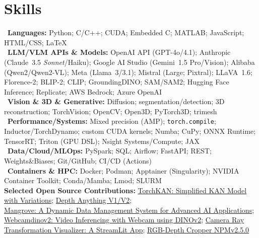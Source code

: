 \section*{Skills}

\textbullet~\textbf{Languages:} Python; C/C++; CUDA; Embedded C; MATLAB; JavaScript; HTML/CSS; \LaTeX\\
\textbullet~\textbf{LLM/VLM APIs \& Models:} OpenAI API (GPT\mbox{-}4o/4.1); Anthropic (Claude~3.5 \emph{Sonnet}/Haiku); Google AI Studio (Gemini~1.5 Pro/Vision); Alibaba (Qwen2/Qwen2\mbox{-}VL); Meta (Llama~3/3.1); Mistral (Large; Pixtral); LLaVA~1.6; Florence\mbox{-}2; BLIP\mbox{-}2; CLIP; GroundingDINO; SAM/SAM2; Hugging Face Inference; Replicate; AWS Bedrock; Azure OpenAI\\
\textbullet~\textbf{Vision \& 3D \& Generative:} Diffusion; segmentation/detection; 3D reconstruction; TorchVision; OpenCV; Open3D; PyTorch3D; trimesh\\
\textbullet~\textbf{Performance/Systems:} Mixed precision (AMP); \texttt{torch.compile}; Inductor/TorchDynamo; custom CUDA kernels; Numba; CuPy; ONNX Runtime; TensorRT; Triton (GPU DSL); Nsight Systems/Compute; JAX\\
\textbullet~\textbf{Data/Cloud/MLOps:} PySpark; SQL; Airflow; FastAPI; REST; Weights\&Biases; Git/GitHub; CI/CD (Actions)\\
\textbullet~\textbf{Containers \& HPC:} Docker; Podman; Apptainer (Singularity); NVIDIA Container Toolkit; Conda/Mamba; Lmod; SLURM\\

\textbf{Selected Open Source Contributions:} 
\href{https://github.com/1ssb/torchkan}{TorchKAN: Simplified KAN Model with Variations};
\href{https://github.com/LiheYoung/Depth-Anything}{Depth Anything V1/V2};  \\
\href{https://github.com/1ssb/mangroves}{Mangrove: A Dynamic Data Management System for Advanced AI Applications};
\href{https://github.com/1ssb/webcamdino}{Webcamdinov2: Video Inferencing with Webcam using DINOv2};
\href{https://github.com/1ssb/ray_visualizer}{Camera Ray Transformation Visualizer: A StreamLit App};
\href{https://github.com/1ssb/RGBD_cropper_tool}{RGB-Depth Cropper NPMv2.5.0}
